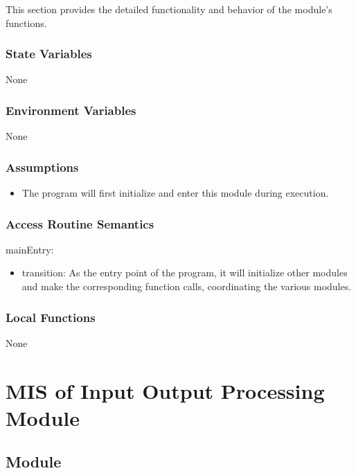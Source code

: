\documentclass[12pt, titlepage]{article}
\begin{document}
This section provides the detailed functionality and behavior of the module’s
functions.

\subsubsection{State Variables}

None

\subsubsection{Environment Variables}

None

\subsubsection{Assumptions}

\begin{itemize}
\item The program will first initialize and enter this module during execution.
\end{itemize}

\subsubsection{Access Routine Semantics}

\noindent mainEntry:
\begin{itemize}
\item transition: As the entry point of the program, it will initialize other
modules and make the corresponding function calls, coordinating the various
modules.
\end{itemize}

\subsubsection{Local Functions}

None

\newpage

\section{MIS of Input Output Processing Module} \label{MIS_IO}

\subsection{Module}
\end{document}
